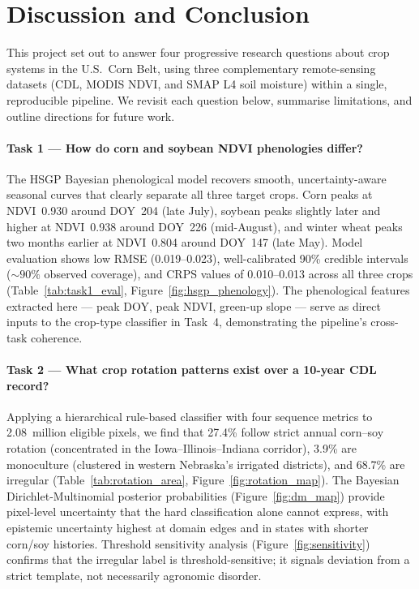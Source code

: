 \documentclass{article}
\begin{document}
\section{Discussion and Conclusion}
\label{sec:disc}

This project set out to answer four progressive research questions about
crop systems in the U.S.\ Corn Belt, using three complementary remote-sensing
datasets (CDL, MODIS NDVI, and SMAP L4 soil moisture) within a single,
reproducible pipeline.  We revisit each question below, summarise limitations,
and outline directions for future work.

\paragraph{Task 1 — How do corn and soybean NDVI phenologies differ?}
The HSGP Bayesian phenological model recovers smooth, uncertainty-aware
seasonal curves that clearly separate all three target crops.
Corn peaks at NDVI~0.930 around DOY~204 (late July), soybean peaks
slightly later and higher at NDVI~0.938 around DOY~226 (mid-August), and
winter wheat peaks two months earlier at NDVI~0.804 around DOY~147 (late May).
Model evaluation shows low RMSE (0.019--0.023), well-calibrated 90\%
credible intervals (${\sim}90\%$ observed coverage), and CRPS values of
0.010--0.013 across all three crops
(Table~\ref{tab:task1_eval}, Figure~\ref{fig:hsgp_phenology}).
The phenological features extracted here --- peak DOY, peak NDVI, green-up
slope --- serve as direct inputs to the crop-type classifier in Task~4,
demonstrating the pipeline's cross-task coherence.

\paragraph{Task 2 — What crop rotation patterns exist over a 10-year CDL record?}
Applying a hierarchical rule-based classifier with four sequence metrics
to 2.08~million eligible pixels, we find that 27.4\% follow strict annual
corn--soy rotation (concentrated in the Iowa--Illinois--Indiana corridor),
3.9\% are monoculture (clustered in western Nebraska's irrigated districts),
and 68.7\% are irregular (Table~\ref{tab:rotation_area},
Figure~\ref{fig:rotation_map}).
The Bayesian Dirichlet-Multinomial posterior probabilities
(Figure~\ref{fig:dm_map}) provide pixel-level uncertainty that the hard
classification alone cannot express, with epistemic uncertainty highest at
domain edges and in states with shorter corn/soy histories.
Threshold sensitivity analysis (Figure~\ref{fig:sensitivity}) confirms
that the irregular label is threshold-sensitive; it signals deviation from
a strict template, not necessarily agronomic disorder.
\end{document}
